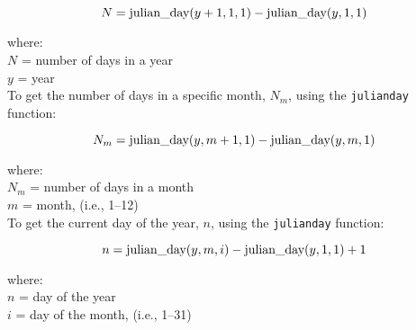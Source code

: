 \begin{equation}
\label{eq:ny}
    N = \text{julian\textunderscore day}(y+1, 1, 1) 
        - \text{julian\textunderscore day}(y, 1, 1)
\end{equation}

\noindent where: \\
\indent $N$ = number of days in a year \\
\indent $y$ = year \\

To get the number of days in a specific month, $N_{m}$, using the \texttt{julian\textunderscore day} function:

\begin{equation}
\label{eq:dmo}
    N_{m} = \text{julian\textunderscore day}(y, m+1, 1) 
            - \text{julian\textunderscore day}(y, m, 1)
\end{equation}

\noindent where: \\
\indent $N_m$ = number of days in a month \\
\indent $m$ = month, (i.e., 1--12) \\

To get the current day of the year, $n$, using the \texttt{julian\textunderscore day} function:

\begin{equation}
\label{eq:doy}
    n = \text{julian\textunderscore day}(y, m, i) 
        - \text{julian\textunderscore day}(y, 1, 1) 
        + 1
\end{equation}

\noindent where: \\
\indent $n$ = day of the year \\
\indent $i$ = day of the month, (i.e., 1--31) \\

